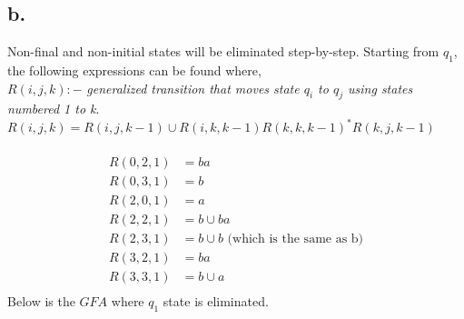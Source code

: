 \documentclass[12pt]{article}
\begin{document}
\subsection*{b.}
Non-final and non-initial states will be eliminated step-by-step. Starting from $q_1$, the following expressions can be found where,\\
$R(i,j,k):- $ \textit{generalized transition that moves state $q_i$ to $q_j$ using states numbered 1 to k}.\\
$R(i,j,k) = R(i,j,k-1) \cup R(i,k,k-1)R(k,k,k-1)^*R(k,j,k-1) $\\~\\
\begin{align*}
    R(0,2,1) &= ba\\
    R(0,3,1) &= b\\
    R(2,0,1) &= a\\
    R(2,2,1) &= b\cup ba\\
    R(2,3,1) &= b\cup b \text{ (which is the same as b)}\\
    R(3,2,1) &= ba\\
    R(3,3,1) &= b\cup a\\
\end{align*}
Below is the $GFA$ where $q_1$ state is eliminated.
\end{document}
